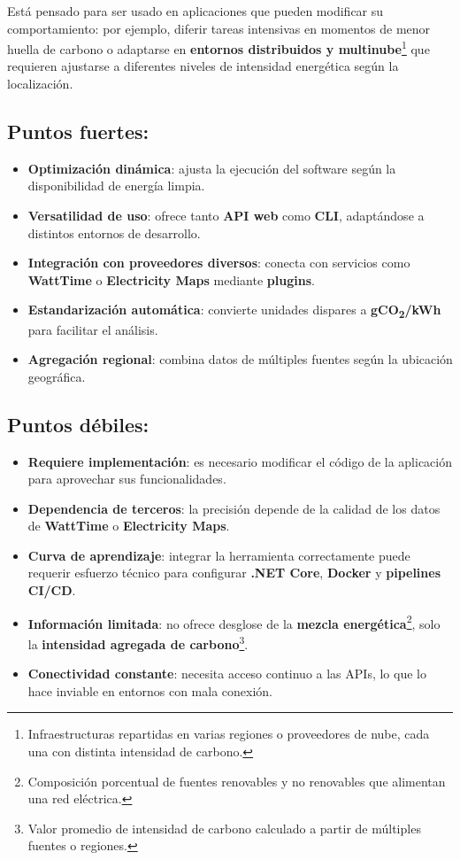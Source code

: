 \documentclass[12pt,a4paper]{report}
\begin{document}
Está pensado para ser usado en aplicaciones que pueden modificar su
comportamiento: por ejemplo, diferir tareas intensivas en momentos de menor
huella de carbono o adaptarse en \textbf{entornos distribuidos y
  multinube}\footnote{Infraestructuras repartidas en varias regiones o
  proveedores de nube, cada una con distinta intensidad de carbono.} que
requieren ajustarse a diferentes niveles de intensidad energética según la
localización.

\subsection*{Puntos fuertes:}

\begin{itemize}
  \item \textbf{Optimización dinámica}: ajusta la ejecución del software según la disponibilidad de energía limpia.
  \item \textbf{Versatilidad de uso}: ofrece tanto \textbf{API web} como \textbf{CLI}, adaptándose a distintos entornos de desarrollo.
  \item \textbf{Integración con proveedores diversos}: conecta con servicios como \textbf{WattTime} o \textbf{Electricity Maps} mediante \textbf{plugins}.
  \item \textbf{Estandarización automática}: convierte unidades dispares a \textbf{gCO\textsubscript{2}/kWh} para facilitar el análisis.
  \item \textbf{Agregación regional}: combina datos de múltiples fuentes según la ubicación geográfica.
\end{itemize}

\subsection*{Puntos débiles:}

\begin{itemize}
  \item \textbf{Requiere implementación}: es necesario modificar el código de la aplicación para aprovechar sus funcionalidades.
  \item \textbf{Dependencia de terceros}: la precisión depende de la calidad de los datos de \textbf{WattTime} o \textbf{Electricity Maps}.
  \item \textbf{Curva de aprendizaje}: integrar la herramienta correctamente puede requerir esfuerzo técnico para configurar \textbf{.NET Core}, \textbf{Docker} y \textbf{pipelines CI/CD}.
  \item \textbf{Información limitada}: no ofrece desglose de la \textbf{mezcla energética}\footnote{Composición porcentual de fuentes renovables y no renovables que alimentan una red eléctrica.}, solo la \textbf{intensidad agregada de carbono}\footnote{Valor promedio de intensidad de carbono calculado a partir de múltiples fuentes o regiones.}.
  \item \textbf{Conectividad constante}: necesita acceso continuo a las APIs, lo que lo hace inviable en entornos con mala conexión.
\end{itemize}
\end{document}
